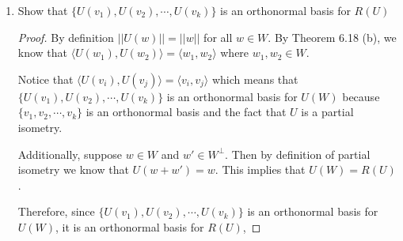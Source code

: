 \documentclass[11pt]{scrartcl}
\begin{document}
\begin{enumerate}[label=\alph*.]
	\item {
	      Show that $\{U(v_1), U(v_2), \cdots , U(v_k)\}$ is an orthonormal basis for $R(U)$
	      \begin{proof}
		      By definition $||U(w)|| = ||w||$ for all $w \in W$. By Theorem 6.18 (b), we know that
		      $\langle U(w_1), U(w_2) \rangle = \langle w_1, w_2 \rangle$ where $w_1, w_2 \in W$.\par
		      Notice that $\langle U(v_i), U(v_j) \rangle =\langle v_i, v_j \rangle$ which means that
		      $\{U(v_1), U(v_2), \cdots , U(v_k)\}$ is an orthonormal basis for $U(W)$ because
		      $\{v_1, v_2, \cdots , v_k\}$ is an orthonormal basis and the fact that $U$ is a partial isometry. \par
		      Additionally, suppose $w \in W$ and $w' \in W^\perp$. Then by definition of partial isometry we know
		      that $U(w + w') = w$. This implies that $U(W) = R(U)$.\par
		      Therefore, since $\{U(v_1), U(v_2), \cdots , U(v_k)\}$ is an orthonormal basis for $U(W)$,
		      it is an orthonormal basis for $R(U)$,
	      \end{proof}

}
\end{enumerate}
\end{document}
